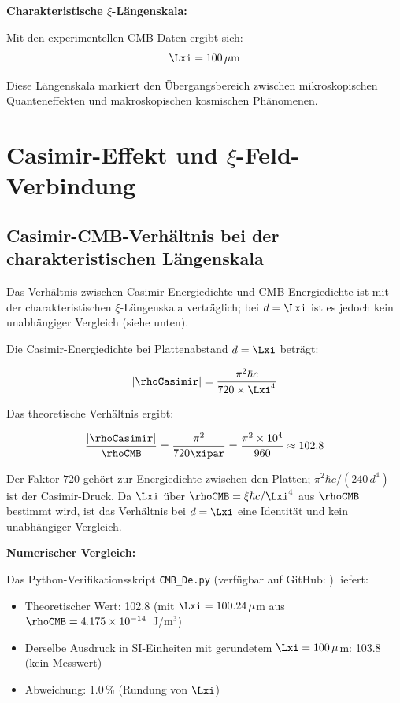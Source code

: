 	\begin{keyresult}
		\textbf{Charakteristische $\xi$-Längenskala:}
		
		Mit den experimentellen CMB-Daten ergibt sich:
		\begin{equation}
			\Lxi = 100 \, \mu\text{m}
		\end{equation}
		
		Diese Längenskala markiert den Übergangsbereich zwischen mikroskopischen Quanteneffekten und makroskopischen kosmischen Phänomenen.
	\end{keyresult}
	
	\section{Casimir-Effekt und $\xi$-Feld-Verbindung}
	
	\subsection{Casimir-CMB-Verhältnis bei der charakteristischen Längenskala}
	
	Das Verhältnis zwischen Casimir-Energiedichte und CMB-Energiedichte ist mit der charakteristischen $\xi$-Längenskala verträglich; bei $d = \Lxi$ ist es jedoch kein unabhängiger Vergleich (siehe unten).
	
	Die Casimir-Energiedichte bei Plattenabstand $d = \Lxi$ beträgt:
	
	\begin{equation}
		|\rhoCasimir| = \frac{\pi^2 \hbar c}{720 \times \Lxi^4}
	\end{equation}
	
	Das theoretische Verhältnis ergibt:
	
	\begin{equation}
		\frac{|\rhoCasimir|}{\rhoCMB} = \frac{\pi^2}{720 \xipar} = \frac{\pi^2 \times 10^4}{960} \approx 102.8
	\end{equation}
	
	Der Faktor $720$ gehört zur Energiedichte zwischen den Platten; $\pi^2\hbar c/(240\,d^4)$ ist der Casimir-Druck. Da $\Lxi$ über $\rhoCMB = \xi\hbar c/\Lxi^4$ aus $\rhoCMB$ bestimmt wird, ist das Verhältnis bei $d = \Lxi$ eine Identität und kein unabhängiger Vergleich.
	
	\begin{experiment}
		\textbf{Numerischer Vergleich:}
		
		Das Python-Verifikationsskript \texttt{CMB\_De.py} (verfügbar auf GitHub: ) liefert:
		
		\begin{itemize}
			\item Theoretischer Wert: 102.8 (mit $\Lxi = 100.24\,\mu$m aus $\rhoCMB = 4.175 \times 10^{-14}$~J/m$^3$)
			\item Derselbe Ausdruck in SI-Einheiten mit gerundetem $\Lxi = 100\,\mu$m: 103.8 (kein Messwert)
			\item Abweichung: 1.0\,\% (Rundung von $\Lxi$)
		\end{itemize}
	\end{experiment}
	
